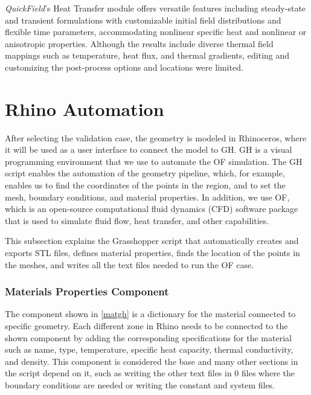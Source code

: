 \textit{QuickField}'s Heat Transfer module offers versatile features including steady-state and transient formulations with customizable initial field distributions and flexible time parameters, accommodating nonlinear specific heat and nonlinear or anisotropic properties. Although the results include diverse thermal field mappings such as temperature, heat flux, and thermal gradients, editing and customizing the post-process options and locations were limited.




\section{Rhino  Automation} %
After selecting the validation case, the geometry is modeled in Rhinoceros, where it will be used as a user interface to connect the model to \gls{GH}. \gls{GH} is a visual programming environment that we use to automate the \gls{OF} simulation. 
The \gls{GH} script enables the automation of the geometry pipeline, which, for example, enables us to find the coordinates of the points in the region, and to set the mesh, boundary conditions, and material properties. 
In addition, we use \gls{OF}, which is an open-source computational fluid dynamics (CFD) software package that is used to simulate fluid flow, heat transfer, and other capabilities. 

This subsection explains the Grasshopper script that automatically creates and exports STL files, defines material properties, finds the location of the points in the meshes, and writes all the text files needed to run the \gls{OF} case.

\subsubsection{Materials Properties Component}
The component shown in \ref{matgh} is a dictionary for the material connected to specific geometry. Each different zone in Rhino needs to be connected to the shown component by adding the corresponding specifications for the material such as name, type, temperature, specific heat capacity, thermal conductivity, and density. This component is considered the base and many other sections in the script depend on it, such as writing the other text files in 0 files where the boundary conditions are needed or writing the constant and system files. 


